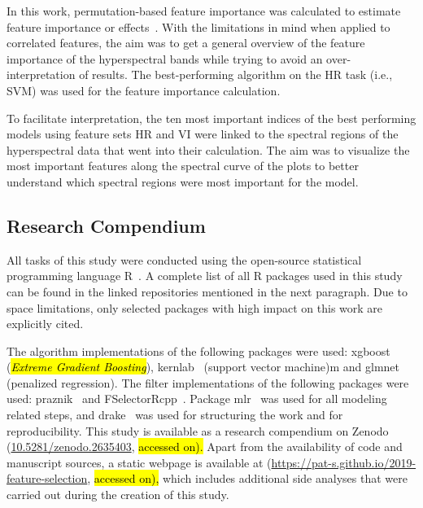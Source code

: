 \documentclass[remotesensing,article,accept,moreauthors,pdftex]{Definitions/mdpi}
\begin{document}
\begin{paracol}{2}
In this work, permutation-based feature importance was calculated to estimate feature importance or effects~\cite{apley2019}.
With the limitations in mind when applied to correlated features, the aim was to get a general overview of the feature importance of the hyperspectral bands while trying to avoid an over-interpretation of results.
The best-performing algorithm on the HR task (i.e., SVM) was used for the feature importance calculation.


To facilitate interpretation, the ten most important indices of the best performing models using feature sets HR and VI were linked to the spectral regions of the hyperspectral data that went into their calculation.
The aim was to visualize the most important features along the spectral curve of the plots to better understand which spectral regions were most important for the model.

\subsection{Research Compendium}

All tasks of this study were conducted using the open-source statistical programming language R~\cite{rcoreteam2019}.
A complete list of all R packages used in this study can be found in the linked repositories mentioned in the next paragraph.
Due to space limitations, only selected packages with high impact on this work are explicitly cited.

The algorithm implementations of the following packages were used: xgboost~\cite{chen2016} (\textit{\hl{Extreme Gradient Boosting}}), %
 kernlab~\cite{kernlab} (support vector machine)m and glmnet~\cite{glmnet} (penalized regression).
The filter implementations of the following packages were used: praznik~\cite{praznik} and FSelectorRcpp~\cite{fselectorrcpp}.
Package mlr~\cite{mlr} was used for all modeling related steps, and
drake~\cite{drake} was used for structuring the work and for reproducibility.
This study is available as a research compendium on Zenodo (\url{10.5281/zenodo.2635403}, \hl{accessed on).} %
Apart from the availability of code and manuscript sources, a static webpage is available at (\url{https://pat-s.github.io/2019-feature-selection}, \hl{accessed on),} %
which includes additional side analyses that were carried out during the creation of this study.


\end{paracol}
\end{document}
